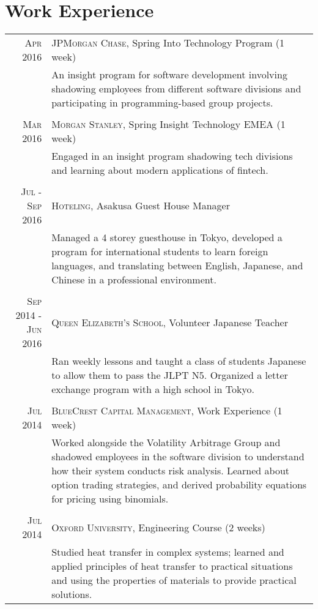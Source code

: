 \documentclass[a4paper,10pt]{article}
\begin{document}
\section{Work Experience}
\begin{tabular}{r|p{11cm}}
 \textsc{Apr 2016} & \textsc{JPMorgan Chase}, Spring Into Technology Program (1 week)\\&\footnotesize{An insight program for software development involving shadowing employees from different software divisions and participating in programming-based group projects.}\\\multicolumn{2}{c}{} \\
 \textsc{Mar 2016} & \textsc{Morgan Stanley}, Spring Insight Technology EMEA (1 week)\\&\footnotesize{Engaged in an insight program shadowing tech divisions and learning about modern applications of fintech. }\\\multicolumn{2}{c}{} \\
 \textsc{Jul - Sep 2016} & \textsc{Hoteling}, Asakusa Guest House Manager\\&\footnotesize{Managed a 4 storey guesthouse in Tokyo, developed a program for international students to learn foreign languages, and translating between English, Japanese, and Chinese in a professional environment.}\\\multicolumn{2}{c}{} \\
\textsc{Sep 2014 - Jun 2016} & \textsc{Queen Elizabeth's School}, Volunteer Japanese Teacher\\&\footnotesize{Ran weekly lessons and taught a class of students Japanese to allow them to pass the JLPT N5. Organized a letter exchange program with a high school in Tokyo.}\\\multicolumn{2}{c}{} \\
\textsc{Jul 2014} & \textsc{BlueCrest Capital Management}, Work Experience (1 week)\\&\footnotesize{Worked alongside the Volatility Arbitrage Group and shadowed employees in the software division to understand how their system conducts risk analysis. Learned about option trading strategies, and derived probability equations for pricing using binomials.}\\\multicolumn{2}{c}{} \\
\textsc{Jul 2014} & \textsc{Oxford University}, Engineering Course (2 weeks)\\&\footnotesize{Studied heat transfer in complex systems; learned and applied principles of heat transfer to practical situations and using the properties of materials to provide practical solutions.}
\end{tabular}
\end{document}
